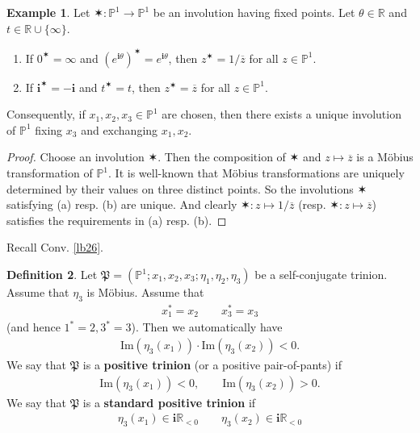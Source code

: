 \documentclass[11pt,b5paper,notitlepage]{article}
\theoremstyle{definition}
\newtheorem{df}{Definition}[section]
\newtheorem{eg}[df]{Example}
\theoremstyle{plain}
\newcommand{\fk}{\mathfrak}
\newcommand{\ovl}{\overline}
\newcommand{\im}{\mathbf{i}}
\newcommand{\Pbb}{\mathbb P}
\newcommand{\Rbb}{\mathbb R}
\newcommand{\Imag}{\mathrm{Im}}
\numberwithin{equation}{section}
\begin{document}
\begin{eg}\label{lb27}
Let $\varstar:\Pbb^1\rightarrow\Pbb^1$ be an involution having fixed points. Let $\theta\in\Rbb$ and $t\in\Rbb\cup\{\infty\}$.
\begin{enumerate}[label=(\alph*)]
\item If $0^\varstar=\infty$ and $(e^{\im\theta})^\varstar=e^{\im\theta}$, then $z^\varstar=1/\ovl z$ for all $z\in\Pbb^1$.
\item If $\im^\varstar=-\im$ and $t^\varstar=t$, then $z^\varstar=\ovl z$ for all $z\in\Pbb^1$.
\end{enumerate}
\end{eg}

Consequently, if $x_1,x_2,x_3\in\Pbb^1$ are chosen, then there exists a unique involution of $\Pbb^1$ fixing $x_3$ and exchanging $x_1,x_2$.


\begin{proof}
Choose an involution $\varstar$. Then the composition of $\varstar$ and $z\mapsto \ovl z$ is a M\"obius transformation of $\Pbb^1$. It is well-known that M\"obius transformations are uniquely determined by their values on three distinct points. So the involutions $\varstar$ satisfying (a) resp. (b)  are unique. And clearly $\varstar:z\mapsto 1/\ovl z$ (resp. $\varstar:z\mapsto \ovl z$) satisfies the requirements in (a) resp. (b). 
\end{proof}


Recall Conv. \ref{lb26}.




\begin{df}\label{lb85}
Let $\fk P=(\Pbb^1;x_1,x_2,x_3;\eta_1,\eta_2,\eta_3)$ be a self-conjugate trinion. Assume that $\eta_3$ is M\"obius. Assume that
\begin{align*}
x_1^*=x_2\qquad x_3^*=x_3
\end{align*}
(and hence $1^*=2,3^*=3$). Then we automatically have
\begin{align}
\Imag(\eta_3(x_1))\cdot\Imag(\eta_3(x_2))<0.\label{eq37}
\end{align}
We say that $\fk P$ is a \textbf{positive trinion} (or a positive pair-of-pants) if
\begin{align*}
\Imag(\eta_3(x_1))<0,\qquad\Imag(\eta_3(x_2))>0.
\end{align*}
We say that $\fk P$ is a \textbf{standard positive trinion} if
\begin{align*}
\eta_3(x_1)\in\im\Rbb_{<0}\qquad \eta_3(x_2)\in\im\Rbb_{<0}
\end{align*}
\end{df}
\end{document}

